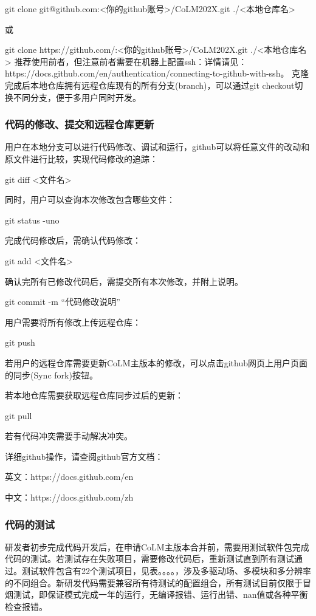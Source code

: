 \documentclass[a4paper,12pt,twoside]{article}
\begin{document}
git clone git@github.com:<你的github账号>/CoLM202X.git ./<本地仓库名>

或

git clone https://github.com/:<你的github账号>/CoLM202X.git ./<本地仓库名>
推荐使用前者，但注意前者需要在机器上配置ssh：详情请见：https://docs.github.com/en/authentication/connecting-to-github-with-ssh。
克隆完成后本地仓库拥有远程仓库现有的所有分支(branch)，可以通过git checkout切换不同分支，便于多用户同时开发。

\subsubsection{代码的修改、提交和远程仓库更新}

用户在本地分支可以进行代码修改、调试和运行，github可以将任意文件的改动和原文件进行比较，实现代码修改的追踪：

git diff <文件名>

同时，用户可以查询本次修改包含哪些文件：

git status -uno

完成代码修改后，需确认代码修改：

git add <文件名>

确认完所有已修改代码后，需提交所有本次修改，并附上说明。

git commit -m “代码修改说明”

用户需要将所有修改上传远程仓库：

git push

若用户的远程仓库需要更新CoLM主版本的修改，可以点击github网页上用户页面的同步(Sync fork)按钮。

若本地仓库需要获取远程仓库同步过后的更新：

git pull

若有代码冲突需要手动解决冲突。

详细github操作，请查阅github官方文档：

英文：https://docs.github.com/en

中文：https://docs.github.com/zh


\subsubsection{代码的测试}

研发者初步完成代码开发后，在申请CoLM主版本合并前，需要用测试软件包完成代码的测试。若测试存在失败项目，需要修改代码后，重新测试直到所有测试通过。测试软件包含有22个测试项目，见表。。。。，涉及多驱动场、多模块和多分辨率的不同组合。新研发代码需要兼容所有待测试的配置组合，所有测试目前仅限于冒烟测试，即保证模式完成一年的运行，无编译报错、运行出错、nan值或各种平衡检查报错。
\end{document}
